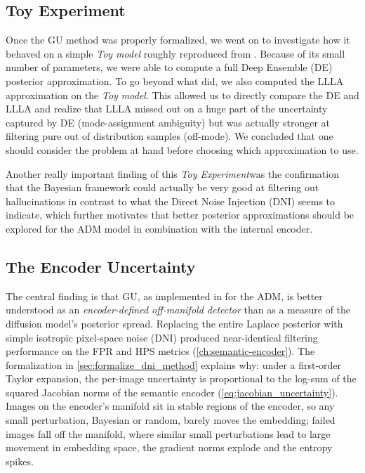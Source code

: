 \subsection{Toy Experiment}
Once the \acs{GU} method was properly formalized, we went on to investigate how it behaved on a simple \textit{Toy model} roughly reproduced from \cite{jazbec_generative_2025}. Because of its small number of parameters, we were able to compute a full Deep Ensemble (\acs{DE}) posterior approximation. To go beyond what \cite{jazbec_generative_2025} did, we also computed the \acs{LLLA} approximation on the \textit{Toy model}. This allowed us to directly compare the \acs{DE} and \acs{LLLA} and realize that \acs{LLLA} missed out on a huge part of the uncertainty captured by \acs{DE} (mode-assignment ambiguity) but was actually stronger at filtering pure out of distribution samples (off-mode). We concluded that one should consider the problem at hand before choosing which approximation to use. 

Another really important finding of this \emph{Toy Experiment}was the confirmation that the Bayesian framework could actually be very good at filtering out hallucinations in contrast to what the Direct Noise Injection (\acs{DNI}) seems to indicate, which further motivates that better posterior approximations should be explored for the \acs{ADM} model in combination with the internal encoder. 

\subsection{The Encoder Uncertainty}
The central finding is that \acs{GU}, as implemented in \cite{jazbec_generative_2025} for the \acs{ADM}, is better understood as an \textit{encoder-defined off-manifold detector} than as a measure of the diffusion model's posterior spread. Replacing the entire Laplace posterior with simple isotropic pixel-space noise (\acs{DNI}) produced near-identical filtering performance on the \acs{FPR} and \acs{HPS} metrics (\autoref{ch:semantic-encoder}). The formalization in \autoref{sec:formalize_dni_method} explains why: under a first-order Taylor expansion, the per-image uncertainty is proportional to the log-sum of the squared Jacobian norms of the semantic encoder (\autoref{eq:jacobian_uncertainty}). Images on the encoder's manifold sit in stable regions of the encoder, so any small perturbation, Bayesian or random, barely moves the embedding; failed images fall off the manifold, where similar small perturbations lead to large movement in embedding space, the gradient norms explode and the entropy spikes. 


